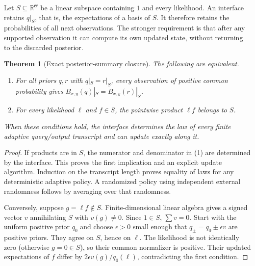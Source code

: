 \documentclass[11pt]{article}
\newtheorem{theorem}{Theorem}
\begin{document}
Let $S\subseteq\mathbb R^\Theta$ be a linear subspace containing $1$ and every likelihood. An interface retains $q|_S$, that is, the expectations of a basis of $S$. It therefore retains the probabilities of all next observations. The stronger requirement is that after any supported observation it can compute its own updated state, without returning to the discarded posterior.
\begin{theorem}[Exact posterior-summary closure]\label{thm:closure}
The following are equivalent.
\begin{enumerate}
\item For all priors $q,r$ with $q|_S=r|_S$, every observation of positive common probability gives $B_{x,y}(q)|_S=B_{x,y}(r)|_S$.
\item For every likelihood $\ell$ and $f\in S$, the pointwise product $\ell f$ belongs to $S$.
\end{enumerate}
When these conditions hold, the interface determines the law of every finite adaptive query/output transcript and can update exactly along it.
\end{theorem}
\begin{proof}
If products are in $S$, the numerator and denominator in (1) are determined by the interface. This proves the first implication and an explicit update algorithm. Induction on the transcript length proves equality of laws for any deterministic adaptive policy. A randomized policy using independent external randomness follows by averaging over that randomness.

Conversely, suppose $g=\ell f\notin S$. Finite-dimensional linear algebra gives a signed vector $v$ annihilating $S$ with $v(g)\ne0$. Since $1\in S$, $\sum v=0$. Start with the uniform positive prior $q_0$ and choose $\epsilon>0$ small enough that $q_\pm=q_0\pm\epsilon v$ are positive priors. They agree on $S$, hence on $\ell$. The likelihood is not identically zero (otherwise $g=0\in S$), so their common normalizer is positive. Their updated expectations of $f$ differ by $2\epsilon v(g)/q_0(\ell)$, contradicting the first condition.
\end{proof}
\end{document}
